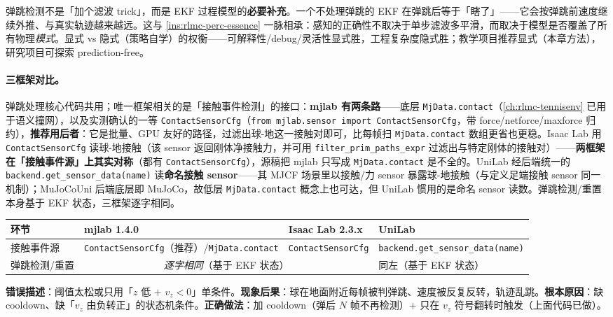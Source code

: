 \begin{insight}\label{ins:rlmc-perc-bounce}
弹跳检测不是「加个滤波 trick」，而是 EKF 过程模型的\textbf{必要补充}。一个不处理弹跳的 EKF 在弹跳后等于「瞎了」——它会按弹跳前速度继续外推、与真实轨迹越来越远。这与 \cref{ins:rlmc-perc-essence} 一脉相承：感知的正确性不取决于单步滤波多平滑，而取决于模型是否覆盖了所有物理\emph{模式}。显式 vs 隐式（策略自学）的权衡——可解释性/debug/灵活性显式胜，工程复杂度隐式胜；教学项目推荐显式（本章方法），研究项目可探索 prediction-free。
\end{insight}

\paragraph{三框架对比。}弹跳处理核心代码共用；唯一框架相关的是「接触事件检测」的接口：\textbf{mjlab 有两条路}——底层 \verb|MjData.contact|（\cref{ch:rlmc-tennisenv} 已用于语义撞网），以及实测确认的一等 \texttt{ContactSensorCfg}（\verb|from mjlab.sensor import ContactSensorCfg|，带 force/netforce/maxforce 归约），\textbf{推荐用后者}：它是批量、GPU 友好的路径，过滤出球-地这一接触对即可，比每帧扫 \verb|MjData.contact| 数组更省也更稳。Isaac Lab 用 \texttt{ContactSensorCfg} 读球-地接触（该 sensor 返回刚体净接触力，并可用 \texttt{filter\_prim\_paths\_expr} 过滤出与特定刚体的接触对）——\textbf{两框架在「接触事件源」上其实对称}（都有 \texttt{ContactSensorCfg}），源稿把 mjlab 只写成 \verb|MjData.contact| 是不全的。UniLab 经后端统一的 \verb|backend.get_sensor_data(name)| 读\textbf{命名接触 sensor}——其 MJCF 场景里以接触/力 sensor 暴露球-地接触（与定义足端接触 sensor 同一机制）；MuJoCoUni 后端底层即 MuJoCo，故低层 \verb|MjData.contact| 概念上也可达，但 UniLab 惯用的是命名 sensor 读数。弹跳检测/重置本身基于 EKF 状态，三框架逐字相同。

\begin{center}
\small
\begin{tabular}{@{}llll@{}}
\toprule
环节 & mjlab 1.4.0 & Isaac Lab 2.3.x & UniLab \\
\midrule
接触事件源 & \verb|ContactSensorCfg|（推荐）/\verb|MjData.contact| & \verb|ContactSensorCfg| & \verb|backend.get_sensor_data(name)| \\
弹跳检测/重置 & \multicolumn{2}{c}{\emph{逐字相同}（基于 EKF 状态）} & 同左（基于 EKF 状态） \\
\bottomrule
\end{tabular}
\end{center}

\begin{pitfall}
\textbf{错误描述}：阈值太松或只用「$z$ 低 $+$ $v_z<0$」单条件。\textbf{现象后果}：球在地面附近每帧被判弹跳、速度被反复反转，轨迹乱跳。\textbf{根本原因}：缺 cooldown、缺「$v_z$ 由负转正」的状态机条件。\textbf{正确做法}：加 cooldown（弹后 $N$ 帧不再检测）$+$ 只在 $v_z$ 符号翻转时触发（上面代码已做）。
\end{pitfall}

